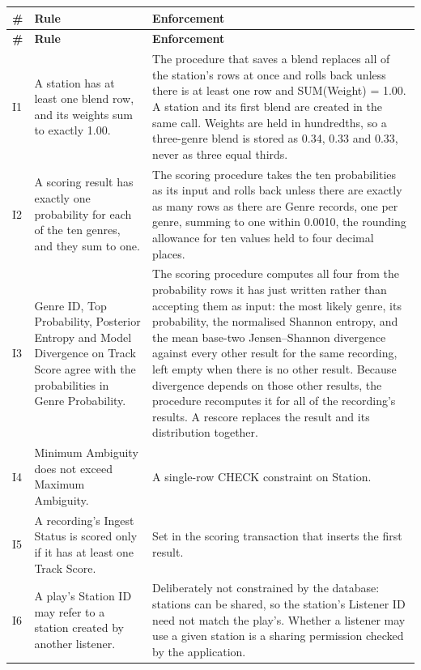 \documentclass[11pt]{article}
\begin{document}
\begin{longtable}{|L{0.35in}|L{2.55in}|L{3.30in}|}
\hline
{}\textbf{\#} & \textbf{Rule} & \textbf{Enforcement} \\ \hline
\endfirsthead
\hline
{}\textbf{\#} & \textbf{Rule} & \textbf{Enforcement} \\ \hline
\endhead
I1 & A station has at least one blend row, and its weights sum to exactly 1.00. & The procedure that saves a blend replaces all of the station's rows at once and rolls back unless there is at least one row and SUM(Weight) = 1.00. A station and its first blend are created in the same call. Weights are held in hundredths, so a three-genre blend is stored as 0.34, 0.33 and 0.33, never as three equal thirds. \\ \hline
I2 & A scoring result has exactly one probability for each of the ten genres, and they sum to one. & The scoring procedure takes the ten probabilities as its input and rolls back unless there are exactly as many rows as there are Genre records, one per genre, summing to one within 0.0010, the rounding allowance for ten values held to four decimal places. \\ \hline
I3 & Genre ID, Top Probability, Posterior Entropy and Model Divergence on Track Score agree with the probabilities in Genre Probability. & The scoring procedure computes all four from the probability rows it has just written rather than accepting them as input: the most likely genre, its probability, the normalised Shannon entropy, and the mean base-two Jensen--Shannon divergence against every other result for the same recording, left empty when there is no other result. Because divergence depends on those other results, the procedure recomputes it for all of the recording's results. A rescore replaces the result and its distribution together. \\ \hline
I4 & Minimum Ambiguity does not exceed Maximum Ambiguity. & A single-row CHECK constraint on Station. \\ \hline
I5 & A recording's Ingest Status is scored only if it has at least one Track Score. & Set in the scoring transaction that inserts the first result. \\ \hline
I6 & A play's Station ID may refer to a station created by another listener. & Deliberately not constrained by the database: stations can be shared, so the station's Listener ID need not match the play's. Whether a listener may use a given station is a sharing permission checked by the application. \\ \hline
\end{longtable}
\end{document}
